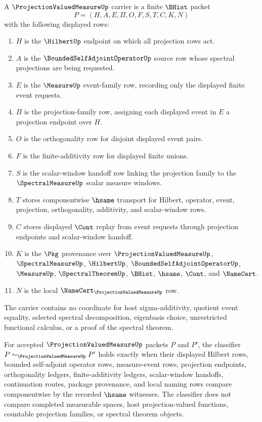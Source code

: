 \begin{definition}
\label{def:projection-valued-measure-carrier}
A $\ProjectionValuedMeasureUp$ carrier is a finite $\BHist$ packet
$$
P=(H,A,E,\Pi,O,F,S,T,C,K,N)
$$
with the following displayed rows:
\begin{enumerate}
\item $H$ is the $\HilbertUp$ endpoint on which all projection rows act.
\item $A$ is the $\BoundedSelfAdjointOperatorUp$ source row whose spectral projections are being requested.
\item $E$ is the $\MeasureUp$ event-family row, recording only the displayed finite event requests.
\item $\Pi$ is the projection-family row, assigning each displayed event in $E$ a projection endpoint over $H$.
\item $O$ is the orthogonality row for disjoint displayed event pairs.
\item $F$ is the finite-additivity row for displayed finite unions.
\item $S$ is the scalar-window handoff row linking the projection family to the $\SpectralMeasureUp$ scalar measure windows.
\item $T$ stores componentwise $\hsame$ transport for Hilbert, operator, event, projection, orthogonality, additivity, and scalar-window rows.
\item $C$ stores displayed $\Cont$ replay from event requests through projection endpoints and scalar-window handoff.
\item $K$ is the $\Pkg$ provenance over $\ProjectionValuedMeasureUp$, $\SpectralMeasureUp$, $\HilbertUp$, $\BoundedSelfAdjointOperatorUp$, $\MeasureUp$, $\SpectralTheoremUp$, $\BHist$, $\hsame$, $\Cont$, and $\NameCert$.
\item $N$ is the local $\NameCert_{\ProjectionValuedMeasureUp}$ row.
\end{enumerate}
The carrier contains no coordinate for host sigma-additivity, quotient event equality, selected spectral decomposition, eigenbasis choice, unrestricted functional calculus, or a proof of the spectral theorem.
\end{definition}

\begin{definition}
\label{def:projection-valued-measure-classifier}
For accepted $\ProjectionValuedMeasureUp$ packets $P$ and $P'$, the classifier $P\sim_{\ProjectionValuedMeasureUp}P'$ holds exactly when their displayed Hilbert rows, bounded self-adjoint operator rows, measure-event rows, projection endpoints, orthogonality ledgers, finite-additivity ledgers, scalar-window handoffs, continuation routes, package provenance, and local naming rows compare componentwise by the recorded $\hsame$ witnesses. The classifier does not compare completed measurable spaces, host projection-valued functions, countable projection families, or spectral theorem objects.
\end{definition}

